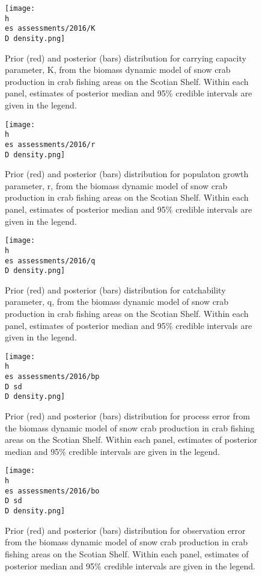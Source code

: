 \documentclass[11pt]{article}
\newcommand{\D}{.}
\newcommand{\h}{\string~}
\newcommand{\es}{bio.data/bio.snowcrab/}
\begin{document}
\begin{figure}
    
    \texttt{[image: \\h \\es assessments/2016/K\\D density.png]}
    \caption{Prior (red) and posterior (bars) distribution for carrying capacity parameter, K, from the biomass dynamic model of snow crab production in crab fishing areas on the Scotian Shelf. Within each panel, estimates of posterior median and 95\% credible intervals are given in the legend.}
  
\end{figure}
\clearpage

\begin{figure}
    
    \texttt{[image: \\h \\es assessments/2016/r\\D density.png]}
    \caption{Prior (red) and posterior (bars) distribution for populaton growth parameter, r, from the biomass dynamic model of snow crab production in crab fishing areas on the Scotian Shelf. Within each panel, estimates of posterior median and 95\% credible intervals are given in the legend.}
  
\end{figure}
\clearpage

\begin{figure}
    
    \texttt{[image: \\h \\es assessments/2016/q\\D density.png]}
    \caption{Prior (red) and posterior (bars) distribution for catchability parameter, q, from the biomass dynamic model of snow crab production in crab fishing areas on the Scotian Shelf. Within each panel, estimates of posterior median and 95\% credible intervals are given in the legend.}
  
\end{figure}
\clearpage



\begin{figure}
    
    \texttt{[image: \\h \\es assessments/2016/bp\\D sd\\D density.png]}
    \caption{Prior (red) and posterior (bars) distribution for process error from the biomass dynamic model of snow crab production in crab fishing areas on the Scotian Shelf. Within each panel, estimates of posterior median and 95\% credible intervals are given in the legend.}
  
\end{figure}
\clearpage

\begin{figure}
    
    \texttt{[image: \\h \\es assessments/2016/bo\\D sd\\D density.png]}
    \caption{Prior (red) and posterior (bars) distribution for observation error from the biomass dynamic model of snow crab production in crab fishing areas on the Scotian Shelf. Within each panel, estimates of posterior median and 95\% credible intervals are given in the legend.}
  
\end{figure}
\clearpage
\end{document}
